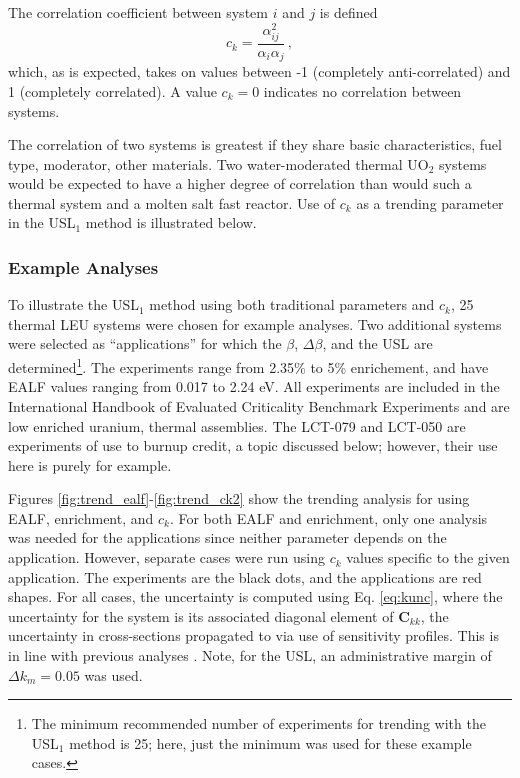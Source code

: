 The correlation coefficient between system $i$ and $j$ is defined
\begin{equation}
 c_{k} =  \frac{\alpha^2_{ij}}{\alpha_i \alpha_j}  \, ,
\label{eq:ck}
\end{equation}
which, as is expected, takes on values between -1 
(completely anti-correlated) and 1 (completely correlated). 
A value $c_k = 0$ indicates no correlation between systems.  

The correlation of two systems is greatest if they share basic 
characteristics, \eg fuel type, moderator, other materials.  Two 
water-moderated thermal UO$_2$ systems would be expected to have 
a higher degree of correlation than would such a thermal system 
and a molten salt fast reactor.  Use of $c_k$ as a trending 
parameter in the USL$_1$ method is illustrated below.


\subsubsection{Example Analyses}

To illustrate the USL$_1$ method using both traditional parameters 
and $c_k$, 25 thermal LEU systems were chosen for example analyses.  
Two additional systems were selected as ``applications'' for which 
the $\beta$, $\Delta \beta$, and the USL are determined\footnote{The 
minimum recommended number of experiments for trending with the 
USL$_1$ method is 25; here, just the minimum was used for these example 
cases.}. The experiments range from 2.35\% to 5\% enrichement, and have 
EALF values ranging from 0.017 to 2.24 eV.  %
All experiments 
are included in the International Handbook of Evaluated Criticality Benchmark 
Experiments \cite{ihecsbe} and are low enriched uranium, thermal assemblies.
The LCT-079 and LCT-050 are experiments
of use to burnup credit, a topic discussed below; however, their use here
is purely for example.  

Figures \ref{fig:trend_ealf}-\ref{fig:trend_ck2} show the trending analysis 
for using EALF, enrichment, and $c_k$.  For both EALF and enrichment, only 
one analysis was needed for the applications since neither parameter depends 
on the application.  However, separate cases were run using $c_k$ values 
specific to the given application.  The experiments are the black dots, 
and the applications are red shapes.  For all cases, the uncertainty is 
computed using Eq. \ref{eq:kunc}, where the uncertainty for the system is 
its associated diagonal element of $\mathbf{C}_{kk}$, \ie the uncertainty 
in cross-sections propagated to \keff via use of sensitivity profiles.  
This is in line with previous analyses \cite{broadhead2004sau}.  Note, for 
the USL, an administrative margin of $\Delta k_m = 0.05$ was used.

